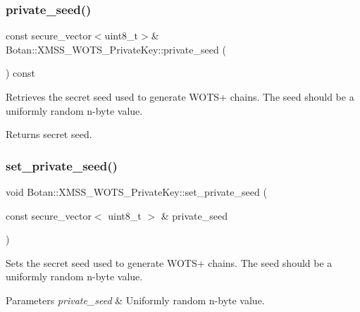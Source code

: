 \subsubsection{\texorpdfstring{private\+\_\+seed()}{private\_seed()}}
{\footnotesize\ttfamily const secure\+\_\+vector$<$uint8\+\_\+t$>$\& Botan\+::\+X\+M\+S\+S\+\_\+\+W\+O\+T\+S\+\_\+\+Private\+Key\+::private\+\_\+seed (\begin{DoxyParamCaption}{ }\end{DoxyParamCaption}) const\hspace{0.3cm}{\ttfamily [inline]}}

Retrieves the secret seed used to generate W\+O\+T\+S+ chains. The seed should be a uniformly random n-\/byte value.

\begin{DoxyReturn}{Returns}
secret seed. 
\end{DoxyReturn}
\mbox{\label{class_botan_1_1_x_m_s_s___w_o_t_s___private_key_abd67c12003a5600b9aaed25b91a96fa5}} 
\subsubsection{\texorpdfstring{set\+\_\+private\+\_\+seed()}{set\_private\_seed()}\hspace{0.1cm}{\footnotesize\ttfamily [1/2]}}
{\footnotesize\ttfamily void Botan\+::\+X\+M\+S\+S\+\_\+\+W\+O\+T\+S\+\_\+\+Private\+Key\+::set\+\_\+private\+\_\+seed (\begin{DoxyParamCaption}\item[{const secure\+\_\+vector$<$ uint8\+\_\+t $>$ \&}]{private\+\_\+seed }\end{DoxyParamCaption})\hspace{0.3cm}{\ttfamily [inline]}}

Sets the secret seed used to generate W\+O\+T\+S+ chains. The seed should be a uniformly random n-\/byte value.


\begin{DoxyParams}{Parameters}
{\em private\+\_\+seed} & Uniformly random n-\/byte value. \\
\hline
\end{DoxyParams}
\mbox{\label{class_botan_1_1_x_m_s_s___w_o_t_s___private_key_a497d20e641d7234d56657e52d307026b}} 
